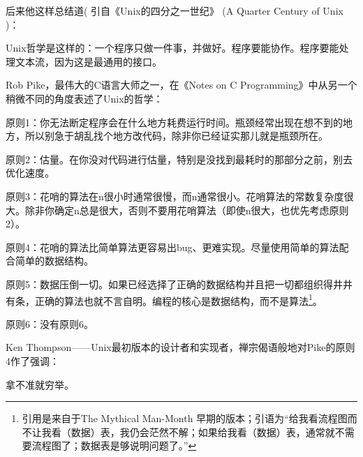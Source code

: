 \documentclass[12pt,oneside]{book}
\begin{document}
\begin{common-format}
后来他这样总结道( 引自《Unix的四分之一世纪》  (A Quarter Century of Unix \cite{Salus}  )：

Unix哲学是这样的：一个程序只做一件事，并做好。程序要能协作。程序要能处理文本流，因为这是最通用的接口。
    
Rob Pike，最伟大的C语言大师之一，在《Notes on C  Programming》中从另一个稍微不同的角度表述了Unix的哲学\cite{Pike}：

原则1：你无法断定程序会在什么地方耗费运行时间。瓶颈经常出现在想不到的地方，所以别急于胡乱找个地方改代码，除非你已经证实那儿就是瓶颈所在。

原则2：估量。在你没对代码进行估量，特别是没找到最耗时的那部分之前，别去优化速度。

原则3：花哨的算法在n很小时通常很慢，而n通常很小。花哨算法的常数复杂度很大。除非你确定n总是很大，否则不要用花哨算法（即使n很大，也优先考虑原则2）。

原则4：花哨的算法比简单算法更容易出bug、更难实现。尽量使用简单的算法配合简单的数据结构。

原则5：数据压倒一切。如果已经选择了正确的数据结构并且把一切都组织得井井有条，正确的算法也就不言自明。编程的核心是数据结构，而不是算法\footnote{引用是来自于The Mythical Man-Month \cite{Brooks}早期的版本；引语为“给我看流程图而不让我看（数据）表，我仍会茫然不解；如果给我看（数据）表，通常就不需要流程图了；数据表是够说明问题了。”}。

原则6：没有原则6。

Ken Thompson——Unix最初版本的设计者和实现者，禅宗偈语般地对Pike的原则4作了强调：

拿不准就穷举。
    

\end{common-format}
\end{document}
